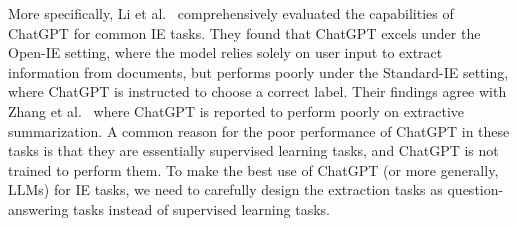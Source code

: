 More specifically, Li et al.~\cite{li2023evaluateChatgpt} comprehensively evaluated the capabilities of ChatGPT for common IE tasks.
They found that ChatGPT excels under the Open-IE setting, where the model relies solely on user input to extract information from documents, but performs poorly under the Standard-IE setting, where ChatGPT is instructed to choose a correct label.
Their findings agree with Zhang et al.~\cite{zhang2023extractive} where ChatGPT is reported to perform poorly on extractive summarization.
A common reason for the poor performance of ChatGPT in these tasks is that they are essentially supervised learning tasks, and ChatGPT is not trained to perform them.
To make the best use of ChatGPT (or more generally, LLMs) for IE tasks, we need to carefully design the extraction tasks as question-answering tasks instead of supervised learning tasks.
